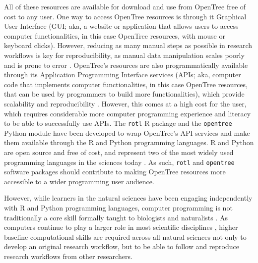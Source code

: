 \documentclass[12pt]{article}
\begin{document}
All of these resources
are available for download and use from OpenTree free of cost to any user.
One way to access OpenTree resources is through it Graphical User
Interface (GUI; aka, a website or application that allows users to access computer
functionalities, in this case OpenTree resources, with mouse or keyboard clicks).
However, reducing as many manual steps as possible in research workflows is key
for reproducibility, as manual data manipulation scales poorly and is prone to
error \citep{bakken2019journey}.
OpenTree's resources are also programmatically available through its Application
Programming Interface services (APIs; aka, computer code that implements computer functionalities,
in this case OpenTree resources, that can be used by programmers
to build more functionalities),
which provide scalability and reproducibility \citep{opentreeAPIv3}.
However, this comes at a high cost for the user, which requires considerable more
computer programming experience and literacy to be able to successfully use APIs.
The \texttt{rotl} R package \citep{michonneau2016rotl} and the \texttt{opentree} Python module
\citep{mctavish2021opentree} have been developed to wrap OpenTree's API services
and make them available through the R and Python programming languages.
R and Python are open source and free of cost, and represent
two of the most widely used programming languages in the sciences today \citep{eglen2009quick,
baker2017scientific}.
As such, \texttt{rotl} and \texttt{opentree} software packages should contribute
to making OpenTree resources more accessible to a wider programming user audience.

However, while learners in the natural sciences have been engaging independently
with R and Python programming languages, computer programming is not traditionally
a core skill formally taught to biologists and naturalists
\citep{sayres2018bioinformatics, wright2019the, williams2019barriers}.
As computers continue to play a larger role in most scientific disciplines \citep{piccolo2016tools},
higher baseline computational skills are required across all natural sciences not only
to develop an original research workflow, but to be able to follow and reproduce
research workflows from other researchers.
\end{document}
